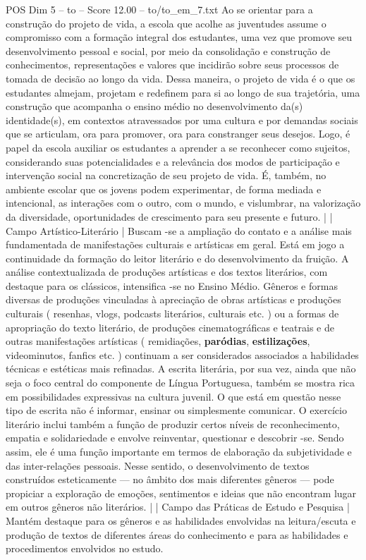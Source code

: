 \begin{textsample}{POS Dim 5 – to – Score 12.00 – to/to\_em\_7.txt}
Ao se orientar para a construção do projeto de vida, a escola que acolhe as juventudes assume o compromisso com a formação integral dos estudantes, uma vez que promove seu desenvolvimento pessoal e social, por meio da consolidação e construção de conhecimentos, representações e valores que incidirão sobre seus processos de tomada de decisão ao longo da vida.
Dessa maneira, o projeto de vida é o que os estudantes almejam, projetam e redefinem para si ao longo de sua trajetória, uma construção que acompanha o ensino médio no desenvolvimento da(s) identidade(s), em contextos atravessados por uma cultura e por demandas sociais que se articulam, ora para promover, ora para constranger seus desejos.
Logo, é papel da escola auxiliar os estudantes a aprender a se reconhecer como sujeitos, considerando suas potencialidades e a relevância dos modos de participação e intervenção social na concretização de seu projeto de vida.
É, também, no ambiente escolar que os jovens podem experimentar, de forma mediada e intencional, as interações com o outro, com o mundo, e vislumbrar, na valorização da diversidade, oportunidades de crescimento para seu presente e futuro. | | Campo Artístico-Literário | Buscam -se a ampliação do contato e a análise mais fundamentada de manifestações culturais e artísticas em geral.
Está em jogo a continuidade da formação do leitor literário e do desenvolvimento da fruição.
A análise contextualizada de produções artísticas e dos textos literários, com destaque para os clássicos, intensifica -se no Ensino Médio.
Gêneros e formas diversas de produções vinculadas à apreciação de obras artísticas e produções culturais ( resenhas, vlogs, podcasts literários, culturais etc. ) ou a formas de apropriação do texto literário, de produções cinematográficas e teatrais e de outras manifestações artísticas ( remidiações, \textbf{paródias}, \textbf{estilizações}, videominutos, fanfics etc. ) continuam a ser considerados associados a habilidades técnicas e estéticas mais refinadas.
A escrita literária, por sua vez, ainda que não seja o foco central do componente de Língua Portuguesa, também se mostra rica em possibilidades expressivas na cultura juvenil.
O que está em questão nesse tipo de escrita não é informar, ensinar ou simplesmente comunicar.
O exercício literário inclui também a função de produzir certos níveis de reconhecimento, empatia e solidariedade e envolve reinventar, questionar e descobrir -se.
Sendo assim, ele é uma função importante em termos de elaboração da subjetividade e das inter-relações pessoais.
Nesse sentido, o desenvolvimento de textos construídos esteticamente — no âmbito dos mais diferentes gêneros — pode propiciar a exploração de emoções, sentimentos e ideias que não encontram lugar em outros gêneros não literários. | | Campo das Práticas de Estudo e Pesquisa | Mantém destaque para os gêneros e as habilidades envolvidas na leitura/escuta e produção de textos de diferentes áreas do conhecimento e para as habilidades e procedimentos envolvidos no estudo.

\end{textsample}
